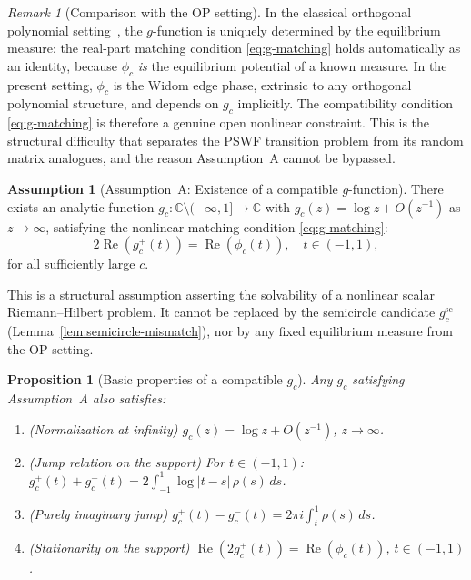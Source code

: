 \documentclass[12pt,a4paper]{amsart}
\newtheorem{proposition}[theorem]{Proposition}
\theoremstyle{definition}
\newtheorem{assumption}[theorem]{Assumption}
\theoremstyle{remark}
\newtheorem{remark}[theorem]{Remark}
\begin{document}
\begin{remark}[Comparison with the OP setting]
\label{rem:op-comparison}
In the classical orthogonal polynomial setting~\cite{Deift1999},
the $g$-function is uniquely determined by the equilibrium measure:
the real-part matching condition \eqref{eq:g-matching} holds
automatically as an identity, because $\phi_c$ \emph{is} the
equilibrium potential of a known measure.
In the present setting, $\phi_c$ is the Widom edge phase, extrinsic
to any orthogonal polynomial structure, and depends on $g_c$ implicitly.
The compatibility condition \eqref{eq:g-matching} is therefore a
genuine open nonlinear constraint.
This is the structural difficulty that separates the PSWF transition
problem from its random matrix analogues, and the reason
Assumption~A cannot be bypassed.
\end{remark}

\begin{assumption}[Assumption~A: Existence of a compatible $g$-function]
\label{ass:g-existence}
There exists an analytic function
$g_c:\mathbb{C}\setminus(-\infty,1]\to\mathbb{C}$
with $g_c(z)=\log z + O(z^{-1})$ as $z\to\infty$,
satisfying the nonlinear matching condition \eqref{eq:g-matching}:
\[
  2\operatorname{Re}(g_c^+(t)) = \operatorname{Re}(\phi_c(t)),
  \quad t\in(-1,1),
\]
for all sufficiently large $c$.

This is a structural assumption asserting the solvability of a
nonlinear scalar Riemann--Hilbert problem. It cannot be replaced by
the semicircle candidate $g_c^{\mathrm{sc}}$
(Lemma~\ref{lem:semicircle-mismatch}), nor by any fixed
equilibrium measure from the OP setting.
\end{assumption}

\begin{proposition}[Basic properties of a compatible $g_c$]
\label{prop:g-properties}
Any $g_c$ satisfying Assumption~A also satisfies:
\begin{enumerate}[label=(\roman*)]
\item (Normalization at infinity)
$g_c(z)=\log z + O(z^{-1})$, $z\to\infty$.
\item (Jump relation on the support) For $t\in(-1,1)$:
$g_c^+(t)+g_c^-(t)=2\int_{-1}^{1}\log|t-s|\,\rho(s)\,ds$.
\item (Purely imaginary jump)
$g_c^+(t)-g_c^-(t)=2\pi i \int_t^1 \rho(s)\,ds$.
\item (Stationarity on the support)
$\operatorname{Re}(2g_c^+(t)) = \operatorname{Re}(\phi_c(t))$,
$t\in(-1,1)$.
\end{enumerate}
\end{proposition}
\end{document}
